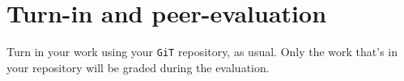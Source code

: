 \documentclass{42-en}
\begin{document}
\chapter{Turn-in and peer-evaluation}

    Turn in your work using your \texttt{GiT} repository, as
    usual. Only the work that's in your repository will be graded during
    the evaluation.



\end{document}
